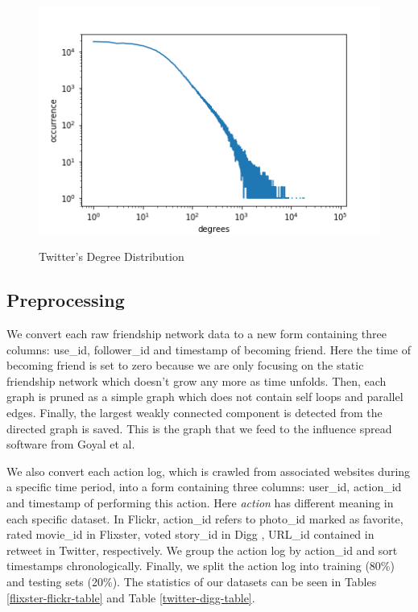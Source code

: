 \documentclass{acm_proc_article-sp}
\begin{document}
\begin{figure}[h]
	\includegraphics[width=\linewidth]{degree-twitter.png}
	\centering
	\label{degree-twitter}
	\caption{Twitter's Degree Distribution}
\end{figure}

\subsection{Preprocessing}
We convert each raw friendship network data to a new form containing three columns: use\_id, follower\_id and timestamp of becoming friend. Here the time of becoming friend is set to zero because we are only focusing on the static friendship network which doesn't grow any more as time unfolds. Then, each graph is pruned as a simple graph which does not contain self loops and parallel edges. Finally, the largest weakly connected component is detected from the directed graph is saved. This is the graph that we feed to the influence spread software from Goyal et al.

We also convert each action log, which is crawled from associated websites during a specific time period, into a form containing three columns: user\_id, action\_id and timestamp of performing this action. Here \textit{action} has different meaning in each specific dataset. In Flickr, action\_id refers to photo\_id marked as favorite, rated movie\_id in Flixster, voted story\_id in Digg , URL\_id contained in retweet in Twitter, respectively. We group the action log by action\_id and sort timestamps chronologically. Finally, we split the action log into training (80\%) and testing sets (20\%). The statistics of our datasets can be seen in Tables \ref{flixster-flickr-table} and Table \ref{twitter-digg-table}.
\end{document}

